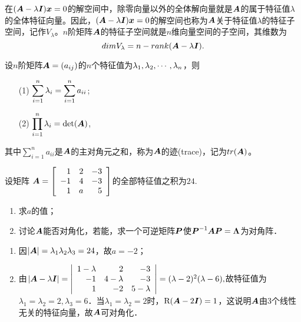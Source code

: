 \begin{frame}[fragile]
 在$(\boldsymbol{A}-\lambda\boldsymbol{I}){\boldsymbol{x}}=0$的解空间中，除零向量以外的全体解向量就是$\boldsymbol{A}$的属于特征值$\lambda$的全体特征向量。因此，$(\boldsymbol{A}-\lambda\boldsymbol{I}){\boldsymbol{x}}=0$的解空间也称为$\boldsymbol{A}$关于特征值$\lambda$的特征子空间，记作$V_\lambda$。$n$阶矩阵$\boldsymbol{A}$的特征子空间就是$n$维向量空间的子空间，其维数为
 $$
 dim V_\lambda = n - rank(\boldsymbol{A}-\lambda \boldsymbol{I}).
 $$
\end{frame}


\begin{frame}[fragile]

\begin{dingli}
  设$n$阶矩阵$\boldsymbol{A}=(a_{ij})$的$n$个特征值为$\lambda_1,\lambda_2,\cdots,\lambda_n$，则
  \begin{itemize}
  \item[(1)] $\displaystyle \sum_{i=1}^n\lambda_i=\sum_{i=1}^na_{ii}$;
  \item[(2)] $\displaystyle \prod_{i=1}^n\lambda_i=\mathrm{det}(\boldsymbol{A})$,         
  \end{itemize}
  其中$\sum_{i=1}^na_{ii}$是$\boldsymbol{A}$的主对角元之和，称为$\boldsymbol{A}$的迹(trace)，记为$tr(\boldsymbol{A})$。
\end{dingli}
\end{frame}

\begin{frame}
  \begin{li}[\red{$\bigstar$}]
    设矩阵
    $\boldsymbol{A}=\left[
      \begin{array}{rrr}
        1&2&-3\\
        -1&4&-3\\
        1&a&5
      \end{array}\right]
    $的全部特征值之积为$24$. \begin{enumerate}
    \item 求$a$的值；
    \item 讨论$\boldsymbol{A}$能否对角化，若能，求一个可逆矩阵$\boldsymbol{P}$使$\boldsymbol{P}^{-1}\boldsymbol{A}\boldsymbol{P}=\boldsymbol{\Lambda}$为对角阵．
    \end{enumerate}                  
  \end{li}\pause
  \begin{jie}
    \begin{enumerate}
    \item 因$|\boldsymbol{A}|=\lambda_1\lambda_2\lambda_3=24$，故$a=-2$；\pause
    \item 由$|\boldsymbol{A}-\lambda\boldsymbol{I}|=\left|
        \begin{array}{rrr}
          1-\lambda&2&-3\\
          -1&4-\lambda&-3\\
          1&-2&5-\lambda
        \end{array}\right|=(\lambda-2)^2(\lambda-6),
      $故特征值为$\lambda_1=\lambda_2=2, \lambda_3=6$．当$\lambda_1=\lambda_2=2$时，$\mathrm{R}(\boldsymbol{A}-2\boldsymbol{I})=1$，这说明$\boldsymbol{A}$由$3$个线性无关的特征向量，故$\boldsymbol{A}$可对角化．
    \end{enumerate}
  \end{jie}
\end{frame}

